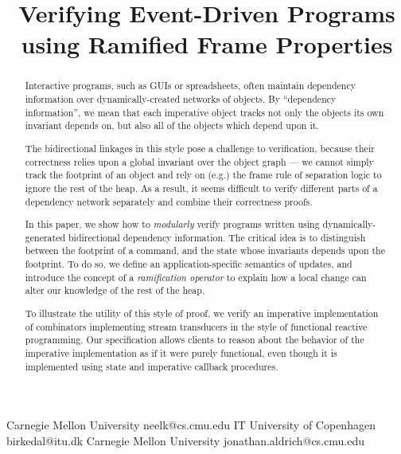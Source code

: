 \documentclass[preprint,natbib]{sigplanconf}
\begin{document}
\copyrightdata{[to be supplied]} 


\title{Verifying Event-Driven Programs using Ramified Frame Properties}

           {Carnegie Mellon University}
           {neelk@cs.cmu.edu}
           {IT University of Copenhagen}
           {birkedal@itu.dk}
           {Carnegie Mellon University}
           {jonathan.aldrich@cs.cmu.edu}
\maketitle

\begin{abstract}
Interactive programs, such as GUIs or spreadsheets, often maintain
dependency information over dynamically-created networks of objects.
By ``dependency information'', we mean that each imperative object
tracks not only the objects its own invariant depends on, but also all
of the objects which depend upon it.

The bidirectional linkages in this style pose a challenge to
verification, because their correctness relies upon a global invariant
over the object graph --- we cannot simply track the footprint of an
object and rely on (e.g.) the frame rule of separation logic to ignore
the rest of the heap. As a result, it seems difficult to verify
different parts of a dependency network separately and combine their
correctness proofs.

In this paper, we show how to \emph{modularly} verify programs written
using dynamically-generated bidirectional dependency information. The
critical idea is to distinguish between the footprint of a command,
and the state whose invariants depends upon the footprint. To do so,
we define an application-specific semantics of updates, and introduce
the concept of a \emph{ramification operator} to explain how a local
change can alter our knowledge of the rest of the heap.

To illustrate the utility of this style of proof, we verify an
imperative implementation of combinators implementing stream
transducers in the style of functional reactive programming. Our
specification allows clients to reason about the behavior of the
imperative implementation as if it were purely functional, even though
it is implemented using state and imperative callback procedures.
\end{abstract}
\end{document}
